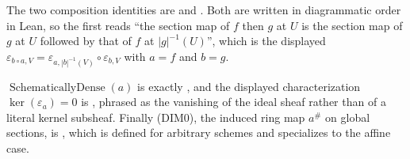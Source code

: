 \begin{definition}
  The two composition identities are \texttt{} and
  \texttt{}.  Both are written in diagrammatic order in
  Lean, so the first reads ``the section map of $f$ then $g$ at $U$ is the section map of $g$
  at $U$ followed by that of $f$ at $|g|^{-1}(U)$'', which is the displayed
  $\varepsilon_{b\circ a,V}=\varepsilon_{a,|b|^{-1}(V)}\circ\varepsilon_{b,V}$ with $a=f$ and
  $b=g$.

  $\operatorname{SchematicallyDense}(a)$ is exactly
  \texttt{}, and the displayed
  characterization $\ker(\varepsilon_a)=0$ is
  \texttt{}, phrased as the vanishing of the
  ideal sheaf \texttt{} rather than of a literal kernel subsheaf.
  Finally (DIM0), the induced ring map $a^{\#}$ on global sections, is
  \texttt{}, which is defined for arbitrary schemes and
  specializes to the affine case.
\end{definition}

